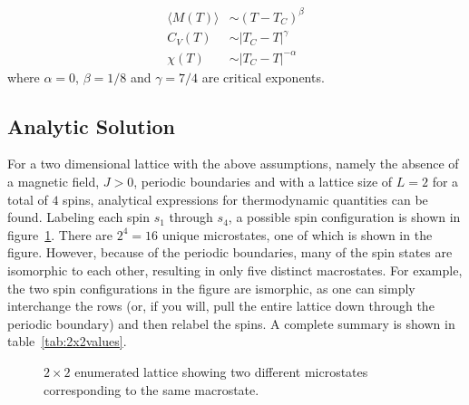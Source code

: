 \documentclass[aps,reprint]{revtex4-1}
\newcommand{\mean}[1]{\langle #1 \rangle}
\begin{document}
\begin{align*}
  \mean{M(T)} &\sim (T - T_C)^\beta \\
  C_V(T) &\sim |T_C - T|^\gamma \\
  \chi (T) &\sim |T_C - T|^{-\alpha}
\end{align*}
where $\alpha = 0$, $\beta = 1/8$ and $\gamma = 7/4$ are critical exponents.

\subsection{Analytic Solution}
\label{sec:analytic-solution-}

For a two dimensional lattice with the above assumptions, namely the absence of a magnetic field, \(J>0\),
periodic boundaries and with a lattice size of \(L=2\) for a total of \(4\)
spins, analytical expressions for thermodynamic quantities can be found.
Labeling each spin \(s_{1}\) through \(s_{4}\), a possible spin configuration is
shown in figure~\ref{fig:22lattice}. There are \(2^{4}=16\) unique microstates, one
of which is shown in the figure. However, because of the periodic boundaries,
many of the spin states are isomorphic to each other, resulting in only five
distinct macrostates. For example, the two spin configurations in the figure are
ismorphic, as one can simply interchange the rows (or, if you will, pull the
entire lattice down through the periodic boundary) and then relabel the spins. A
complete summary is shown in table~\ref{tab:2x2values}.

\begin{figure}[H]
  \centering
  \caption{$2 \times 2$ enumerated lattice showing two different microstates
    corresponding to the same macrostate.}
  \label{fig:22lattice}
\end{figure}
\end{document}
